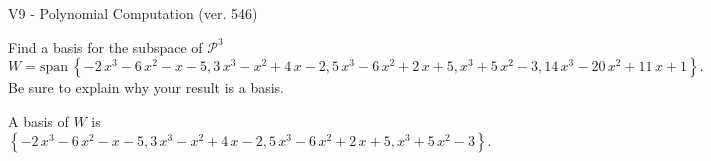 \begin{exercise}
  \begin{exerciseTitle}V9 - Polynomial Computation (ver. 546)\end{exerciseTitle}
  \begin{exerciseStatement}
    Find a basis for the subspace of \(\mathcal{P}^3\) 
\[W=\mathrm{span}\ \left\{-2 \, x^{3} - 6 \, x^{2} - x - 5 , 3 \, x^{3} - x^{2} + 4 \, x - 2 , 5 \, x^{3} - 6 \, x^{2} + 2 \, x + 5 , x^{3} + 5 \, x^{2} - 3 , 14 \, x^{3} - 20 \, x^{2} + 11 \, x + 1\right\}.\]
 Be sure to explain why your result is a basis.


  \end{exerciseStatement}
  \begin{exerciseAnswer}
   A basis of \(W\) is  \(\left\{-2 \, x^{3} - 6 \, x^{2} - x - 5 , 3 \, x^{3} - x^{2} + 4 \, x - 2 , 5 \, x^{3} - 6 \, x^{2} + 2 \, x + 5 , x^{3} + 5 \, x^{2} - 3\right\}\).
  


  \end{exerciseAnswer}
\end{exercise}